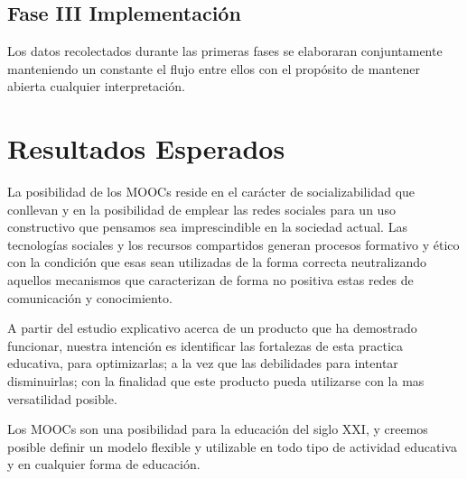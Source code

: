 \documentclass[10pt]{article}
\begin{document}
\begin{description}
\subsection {Fase III Implementación}  Los datos recolectados durante las primeras fases se elaboraran conjuntamente  manteniendo un constante  el flujo entre ellos con el propósito de mantener abierta cualquier interpretación.


\section{Resultados Esperados}

\item La posibilidad de los MOOCs reside en el carácter de socializabilidad que conllevan y en la posibilidad de emplear las redes sociales para un uso constructivo que pensamos sea imprescindible en la sociedad actual. Las tecnologías sociales y los recursos compartidos generan procesos formativo y ético con la condición que esas sean utilizadas de la forma correcta neutralizando aquellos mecanismos que caracterizan de forma no positiva estas redes de comunicación y conocimiento.

\item A partir del estudio explicativo acerca de un producto que ha demostrado funcionar, nuestra intención es identificar las fortalezas de esta practica educativa, para optimizarlas; a la vez que las debilidades para intentar disminuirlas; con la finalidad que este producto pueda utilizarse con la mas versatilidad posible. 

\item Los MOOCs son una posibilidad para la educación del siglo XXI, y creemos posible definir un modelo flexible y utilizable en todo tipo de actividad educativa y en cualquier forma de educación. 


\end{description}

\vspace{10pt}






\nocite{}
\nocite{*}

\end{document}
